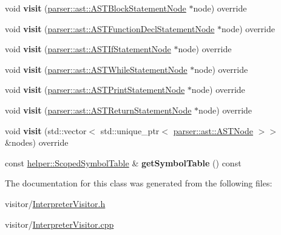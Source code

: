 \begin{DoxyCompactItemize}
\item 
\mbox{\label{classvisitor_1_1InterpreterVisitor_aaae681112d72ad284950bdae70fca289}} 
void {\bfseries visit} (\hyperlink{classparser_1_1ast_1_1ASTBlockStatementNode}{parser\+::ast\+::\+A\+S\+T\+Block\+Statement\+Node} $\ast$node) override
\item 
\mbox{\label{classvisitor_1_1InterpreterVisitor_a8794d5b1f7495b6a8530dfdd73e3ec3a}} 
void {\bfseries visit} (\hyperlink{classparser_1_1ast_1_1ASTFunctionDeclStatementNode}{parser\+::ast\+::\+A\+S\+T\+Function\+Decl\+Statement\+Node} $\ast$node) override
\item 
\mbox{\label{classvisitor_1_1InterpreterVisitor_a177f5f7515bd9ab07ad6c3792fb2591c}} 
void {\bfseries visit} (\hyperlink{classparser_1_1ast_1_1ASTIfStatementNode}{parser\+::ast\+::\+A\+S\+T\+If\+Statement\+Node} $\ast$node) override
\item 
\mbox{\label{classvisitor_1_1InterpreterVisitor_a25837b644b8527ec237445764c5c969a}} 
void {\bfseries visit} (\hyperlink{classparser_1_1ast_1_1ASTWhileStatementNode}{parser\+::ast\+::\+A\+S\+T\+While\+Statement\+Node} $\ast$node) override
\item 
\mbox{\label{classvisitor_1_1InterpreterVisitor_a82515caa4e94b97d1b229447ca26d634}} 
void {\bfseries visit} (\hyperlink{classparser_1_1ast_1_1ASTPrintStatementNode}{parser\+::ast\+::\+A\+S\+T\+Print\+Statement\+Node} $\ast$node) override
\item 
\mbox{\label{classvisitor_1_1InterpreterVisitor_a3bbe6812aea4b9b7221b99e078aa89a9}} 
void {\bfseries visit} (\hyperlink{classparser_1_1ast_1_1ASTReturnStatementNode}{parser\+::ast\+::\+A\+S\+T\+Return\+Statement\+Node} $\ast$node) override
\item 
\mbox{\label{classvisitor_1_1InterpreterVisitor_a31210bc4525068f9ee4e56b545814205}} 
void {\bfseries visit} (std\+::vector$<$ std\+::unique\+\_\+ptr$<$ \hyperlink{classparser_1_1ast_1_1ASTNode}{parser\+::ast\+::\+A\+S\+T\+Node} $>$$>$ \&nodes) override
\item 
\mbox{\label{classvisitor_1_1InterpreterVisitor_a361da803df3ed71e0665b065439a69f0}} 
const \hyperlink{classvisitor_1_1helper_1_1ScopedSymbolTable}{helper\+::\+Scoped\+Symbol\+Table} \& {\bfseries get\+Symbol\+Table} () const
\end{DoxyCompactItemize}


The documentation for this class was generated from the following files\+:\begin{DoxyCompactItemize}
\item 
visitor/\hyperlink{InterpreterVisitor_8h}{Interpreter\+Visitor.\+h}\item 
visitor/\hyperlink{InterpreterVisitor_8cpp}{Interpreter\+Visitor.\+cpp}\end{DoxyCompactItemize}
